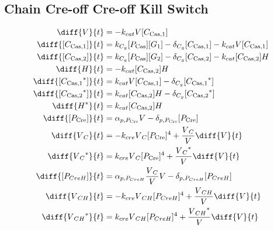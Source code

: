\subsection{Chain Cre-off Cre-off Kill Switch}
\label{s:Chain_Cre_off_Cre_off_Kill_Switch}

\begin{align}
\diff{\vectorGen{}}{t} & = - \casCutRate{{}}\vectorGen{}\conc{\cplx{\cas}{1}}\\
\diff{\conc{\cplx{\cas}{1}}}{t} & =  \gRnaBind{}\conc{\proSp{\cas{}}}\conc{\gRna{1}} - \casCompDegradeRate{}\conc{\cplx{\cas}{1}} - \casCutRate{{}}\vectorGen{}\conc{\cplx{\cas}{1}}\\
\diff{\conc{\cplx{\cas}{2}}}{t} & =  \gRnaBind{}\conc{\proSp{\cas{}}}\conc{\gRna{2}} - \casCompDegradeRate{}\conc{\cplx{\cas}{2}} - \casCutRate{{}}\conc{\cplx{\cas}{2}}\hostGen{}\\
\diff{\hostGen{}}{t} & = - \casCutRate{{}}\conc{\cplx{\cas}{2}}\hostGen{}\\
\diff{\conc{\bound{\cplx{\cas}{1}}}}{t} & =  \casCutRate{{}}\vectorGen{}\conc{\cplx{\cas}{1}} - \casCompDegradeRate{}\conc{\bound{\cplx{\cas}{1}}}\\
\diff{\conc{\bound{\cplx{\cas}{2}}}}{t} & =  \casCutRate{{}}\conc{\cplx{\cas}{2}}\hostGen{} - \casCompDegradeRate{}\conc{\bound{\cplx{\cas}{2}}}\\
\diff{\edited{\hostGen{}}}{t} & =  \casCutRate{{}}\conc{\cplx{\cas}{2}}\hostGen{}\\
\diff{\conc{\proSp{\cre{}}}}{t} & =  \txtlRate{\proSp{\cre{}}}\vectorGen{} - \proDegradeRate{\proSp{\cre{}}}\conc{\proSp{\cre{}}}\\
\diff{\vectorGen{}_C}{t} & = - \creCutRate{} \vectorGen{}_C \conc{\proSp{\cre{}}}^4 + \frac{\vectorGen{}_C}{\vectorGen{}} \diff{\vectorGen{}}{t}\\
\diff{\edited{\vectorGen{}_C}}{t} & =  \creCutRate{} \vectorGen{}_C \conc{\proSp{\cre{}}}^4 + \frac{\edited{\vectorGen{}_C}}{\vectorGen{}} \diff{\vectorGen{}}{t}\\
\diff{\conc{\proSp{CreH}}}{t} & =  \txtlRate{\proSp{CreH}}\frac{\vectorGen{}_C}{\vectorGen{}}\vectorGen{} - \proDegradeRate{\proSp{CreH}}\conc{\proSp{CreH}}\\
\diff{\vectorGen{}_{CH}}{t} & = - \creCutRate{} \vectorGen{}_{CH} \conc{\proSp{CreH}}^4 + \frac{\vectorGen{}_{CH}}{\vectorGen{}} \diff{\vectorGen{}}{t}\\
\diff{\edited{\vectorGen{}_{CH}}}{t} & =  \creCutRate{} \vectorGen{}_{CH} \conc{\proSp{CreH}}^4 + \frac{\edited{\vectorGen{}_{CH}}}{\vectorGen{}} \diff{\vectorGen{}}{t}\\

\end{align}
